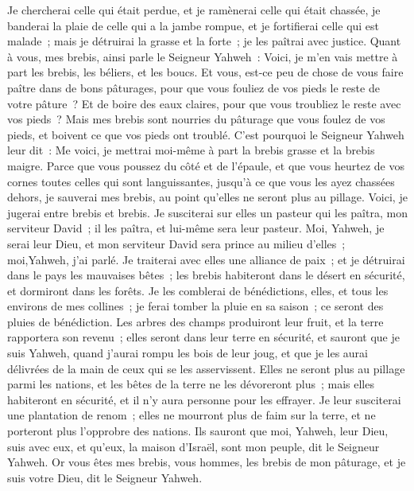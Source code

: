 \begin{multicols}{2}
Je chercherai celle qui était perdue, et je ramènerai celle qui était chassée, je banderai la plaie de celle qui a la jambe rompue, et je fortifierai celle qui est malade~; mais je détruirai la grasse et la forte~; je les paîtrai avec justice.
Quant à vous, mes brebis, ainsi parle le Seigneur Yahweh~: Voici, je m'en vais mettre à part les brebis, les béliers, et les boucs.
Et vous, est-ce peu de chose de vous faire paître dans de bons pâturages, pour que vous fouliez de vos pieds le reste de votre pâture~? Et de boire des eaux claires, pour que vous troubliez le reste avec vos pieds~?
Mais mes brebis sont nourries du pâturage que vous foulez de vos pieds, et boivent ce que vos pieds ont troublé.
C'est pourquoi le Seigneur Yahweh leur dit~: Me voici, je mettrai moi-même à part la brebis grasse et la brebis maigre.
Parce que vous poussez du côté et de l'épaule, et que vous heurtez de vos cornes toutes celles qui sont languissantes, jusqu'à ce que vous les ayez chassées dehors,
je sauverai mes brebis, au point qu'elles ne seront plus au pillage. Voici, je jugerai entre brebis et brebis.
Je susciterai sur elles un pasteur qui les paîtra, mon serviteur David~; il les paîtra, et lui-même sera leur pasteur.
Moi, Yahweh, je serai leur Dieu, et mon serviteur David sera prince au milieu d'elles~; moi,Yahweh, j'ai parlé.
Je traiterai avec elles une alliance de paix~; et je détruirai dans le pays les mauvaises bêtes~; les brebis habiteront dans le désert en sécurité, et dormiront dans les forêts.
Je les comblerai de bénédictions, elles, et tous les environs de mes collines~; je ferai tomber la pluie en sa saison~; ce seront des pluies de bénédiction.
Les arbres des champs produiront leur fruit, et la terre rapportera son revenu~; elles seront dans leur terre en sécurité, et sauront que je suis Yahweh, quand j'aurai rompu les bois de leur joug, et que je les aurai délivrées de la main de ceux qui se les asservissent.
Elles ne seront plus au pillage parmi les nations, et les bêtes de la terre ne les dévoreront plus~; mais elles habiteront en sécurité, et il n'y aura personne pour les effrayer.
Je leur susciterai une plantation de renom~; elles ne mourront plus de faim sur la terre, et ne porteront plus l'opprobre des nations.
Ils sauront que moi, Yahweh, leur Dieu, suis avec eux, et qu'eux, la maison d'Israël, sont mon peuple, dit le Seigneur Yahweh.
Or vous êtes mes brebis, vous hommes, les brebis de mon pâturage, et je suis votre Dieu, dit le Seigneur Yahweh.

\end{multicols}
